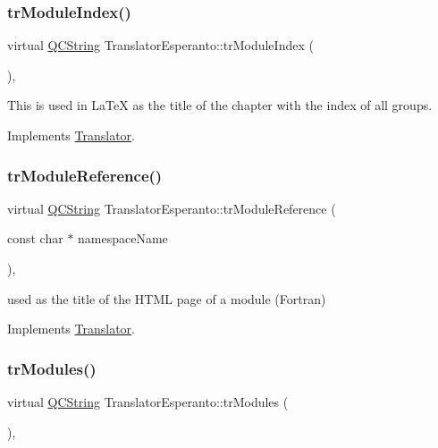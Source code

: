 \subsubsection{\texorpdfstring{trModuleIndex()}{trModuleIndex()}}
{\footnotesize\ttfamily virtual \mbox{\hyperlink{class_q_c_string}{Q\+C\+String}} Translator\+Esperanto\+::tr\+Module\+Index (\begin{DoxyParamCaption}{ }\end{DoxyParamCaption})\hspace{0.3cm}{\ttfamily [inline]}, {\ttfamily [virtual]}}

This is used in La\+TeX as the title of the chapter with the index of all groups. 

Implements \mbox{\hyperlink{class_translator}{Translator}}.

\mbox{\label{class_translator_esperanto_aee8d315c8f23ed16d867f5b161444227}} 
\subsubsection{\texorpdfstring{trModuleReference()}{trModuleReference()}}
{\footnotesize\ttfamily virtual \mbox{\hyperlink{class_q_c_string}{Q\+C\+String}} Translator\+Esperanto\+::tr\+Module\+Reference (\begin{DoxyParamCaption}\item[{const char $\ast$}]{namespace\+Name }\end{DoxyParamCaption})\hspace{0.3cm}{\ttfamily [inline]}, {\ttfamily [virtual]}}

used as the title of the H\+T\+ML page of a module (Fortran) 

Implements \mbox{\hyperlink{class_translator}{Translator}}.

\mbox{\label{class_translator_esperanto_a15e0a790a35172799fe4e09f017ac2ff}} 
\subsubsection{\texorpdfstring{trModules()}{trModules()}}
{\footnotesize\ttfamily virtual \mbox{\hyperlink{class_q_c_string}{Q\+C\+String}} Translator\+Esperanto\+::tr\+Modules (\begin{DoxyParamCaption}{ }\end{DoxyParamCaption})\hspace{0.3cm}{\ttfamily [inline]}, {\ttfamily [virtual]}}

